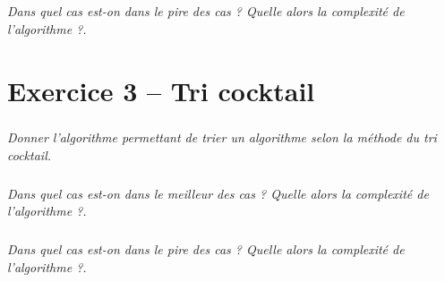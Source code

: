 \documentclass[10pt,fleqn]{article} %
\begin{document}
\begin{multicols}{2}
\subparagraph{}
\textit{Dans quel cas est-on dans le pire des cas ? Quelle alors la complexité de l'algorithme ?.}


\section*{Exercice 3 -- Tri cocktail}
\setcounter{exo}{0}
\subparagraph*{}
\textit{Donner l'algorithme permettant de trier un algorithme selon la méthode du tri cocktail.}
\ifprof
\begin{corrige}
\end{corrige}
\else
\fi

\subparagraph{}
\textit{Dans quel cas est-on dans le meilleur des cas ? Quelle alors la complexité de l'algorithme ?.}

\subparagraph{}
\textit{Dans quel cas est-on dans le pire des cas ? Quelle alors la complexité de l'algorithme ?.}

\end{multicols}
\end{document}
